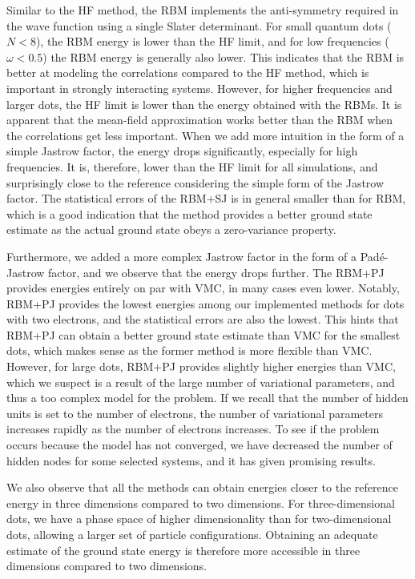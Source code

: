 Similar to the HF method, the RBM implements the anti-symmetry required in the wave function using a single Slater determinant. For small quantum dots ($N<8$), the RBM energy is lower than the HF limit, and for low frequencies ($\omega<0.5$) the RBM energy is generally also lower. This indicates that the RBM is better at modeling the correlations compared to the HF method, which is important in strongly interacting systems. However, for higher frequencies and larger dots, the HF limit is lower than the energy obtained with the RBMs. It is apparent that the mean-field approximation works better than the RBM when the correlations get less important. When we add more intuition in the form of a simple Jastrow factor, the energy drops significantly, especially for high frequencies. It is, therefore, lower than the HF limit for all simulations, and surprisingly close to the reference considering the simple form of the Jastrow factor. The statistical errors of the RBM+SJ is in general smaller than for RBM, which is a good indication that the method provides a better ground state estimate as the actual ground state obeys a zero-variance property. 

Furthermore, we added a more complex Jastrow factor in the form of a Padé-Jastrow factor, and we observe that the energy drops further. The RBM+PJ provides energies entirely on par with VMC, in many cases even lower. Notably, RBM+PJ provides the lowest energies among our implemented methods for dots with two electrons, and the statistical errors are also the lowest. This hints that RBM+PJ can obtain a better ground state estimate than VMC for the smallest dots, which makes sense as the former method is more flexible than VMC. However, for large dots, RBM+PJ provides slightly higher energies than VMC, which we suspect is a result of the large number of variational parameters, and thus a too complex model for the problem. If we recall that the number of hidden units is set to the number of electrons, the number of variational parameters increases rapidly as the number of electrons increases. To see if the problem occurs because the model has not converged, we have decreased the number of hidden nodes for some selected systems, and it has given promising results.

We also observe that all the methods can obtain energies closer to the reference energy in three dimensions compared to two dimensions. For three-dimensional dots, we have a phase space of higher dimensionality than for two-dimensional dots, allowing a larger set of particle configurations. Obtaining an adequate estimate of the ground state energy is therefore more accessible in three dimensions compared to two dimensions.

